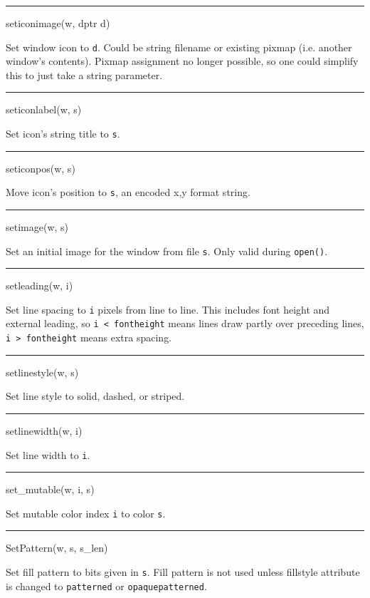 \bigskip\hrule\vspace{0.1cm}
\noindent
seticonimage(w, dptr d)


Set window icon to \texttt{d}. Could be string filename or existing
pixmap (i.e. another window's contents). Pixmap assignment no longer
possible, so one could simplify this to just take a string parameter.


\bigskip\hrule\vspace{0.1cm}
\noindent
seticonlabel(w, s)


Set icon's string title to \texttt{s}.


\bigskip\hrule\vspace{0.1cm}
\noindent
seticonpos(w, s)


Move icon's position to \texttt{s}, an encoded
{\textquotedbl}x,y{\textquotedbl} format string.


\bigskip\hrule\vspace{0.1cm}
\noindent
setimage(w, s)


Set an initial image for the window from file \texttt{s}. Only valid
during \texttt{open()}.


\bigskip\hrule\vspace{0.1cm}
\noindent
setleading(w, i)


Set line spacing to \texttt{i} pixels from line to line. This includes
font height and external leading, so \texttt{i {\textless} fontheight}
means lines draw partly over preceding lines, \texttt{i {\textgreater}
fontheight} means extra spacing.


\bigskip\hrule\vspace{0.1cm}
\noindent
setlinestyle(w, s)


Set line style to solid, dashed, or striped.


\bigskip\hrule\vspace{0.1cm}
\noindent
setlinewidth(w, i)


Set line width to \texttt{i}.


\bigskip\hrule\vspace{0.1cm}
\noindent
set\_mutable(w, i, s)


Set mutable color index \texttt{i} to color \texttt{s}.


\bigskip\hrule\vspace{0.1cm}
\noindent
SetPattern(w, s, s\_len)


Set fill pattern to bits given in \texttt{s}. Fill pattern is not used
unless fillstyle attribute is changed to
\texttt{{\textquotedbl}patterned{\textquotedbl}} or
\texttt{{\textquotedbl}opaquepatterned{\textquotedbl}}.


